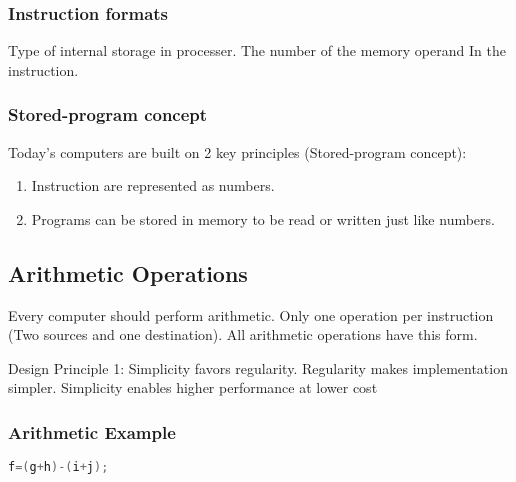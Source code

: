 \subsubsection{Instruction formats}
\begin{figure}[!htb]
    \centering
\end{figure}
Type of internal storage in processer. 
The number of the memory operand In the instruction. 

\subsubsection{Stored-program concept}
Today's computers are built on 2 key principles (Stored-program concept): 
\begin{enumerate}
    \item Instruction are represented as numbers.
    \item Programs can be stored in memory to be read or written just like numbers.
\end{enumerate}

\subsection{Arithmetic Operations}
Every computer should perform arithmetic. Only one operation per instruction (Two sources and one destination). 
All arithmetic operations have this form. 

Design Principle 1: Simplicity favors regularity. Regularity makes implementation simpler. Simplicity enables higher performance at lower cost

\subsubsection{Arithmetic Example}
\begin{lstlisting}[language=c, title={C code}]
f=(g+h)-(i+j);
\end{lstlisting}

